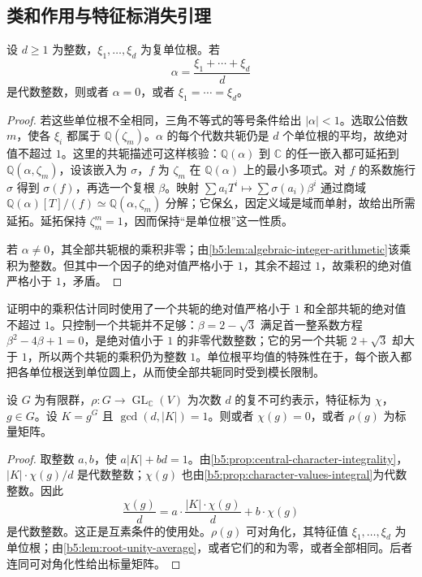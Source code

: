 \subsection{类和作用与特征标消失引理}
\label{b5:subsec:0505:02}

\begin{lemma}[单位根平均值]\label{b5:lem:root-unity-average}
	设 \(d\ge1\) 为整数，\(\xi_1,\ldots,\xi_d\) 为复单位根。若
	\[
		\alpha=\frac{\xi_1+\cdots+\xi_d}{d}
	\]
	是代数整数，则或者 \(\alpha=0\)，或者 \(\xi_1=\cdots=\xi_d\)。
\end{lemma}
\begin{proof}
	若这些单位根不全相同，三角不等式的等号条件给出 \(|\alpha|<1\)。选取公倍数 \(m\)，使各 \(\xi_i\) 都属于 \(\mathbb Q(\zeta_m)\)。\(\alpha\) 的每个代数共轭仍是 \(d\) 个单位根的平均，故绝对值不超过 \(1\)。这里的共轭描述可这样核验：\(\mathbb Q(\alpha)\) 到 \(\mathbb C\) 的任一嵌入都可延拓到 \(\mathbb Q(\alpha,\zeta_m)\)，设该嵌入为 \(\sigma\)，\(f\) 为 \(\zeta_m\) 在 \(\mathbb Q(\alpha)\) 上的最小多项式。对 \(f\) 的系数施行 \(\sigma\) 得到 \(\sigma(f)\)，再选一个复根 \(\beta\)。映射 \(\sum a_iT^i\mapsto\sum\sigma(a_i)\beta^i\) 通过商域 \(\mathbb Q(\alpha)[T]/(f)\simeq\mathbb Q(\alpha,\zeta_m)\) 分解；它保幺，因定义域是域而单射，故给出所需延拓。延拓保持 \(\zeta_m^m=1\)，因而保持“是单位根”这一性质。

	若 \(\alpha\ne0\)，其全部共轭根的乘积非零；由\cref{b5:lem:algebraic-integer-arithmetic}该乘积为整数。但其中一个因子的绝对值严格小于 \(1\)，其余不超过 \(1\)，故乘积的绝对值严格小于 \(1\)，矛盾。
\end{proof}

证明中的乘积估计同时使用了一个共轭的绝对值严格小于 \(1\) 和全部共轭的绝对值不超过 \(1\)。只控制一个共轭并不足够：\(\beta=2-\sqrt3\) 满足首一整系数方程 \(\beta^2-4\beta+1=0\)，是绝对值小于 \(1\) 的非零代数整数；它的另一个共轭 \(2+\sqrt3\) 却大于 \(1\)，所以两个共轭的乘积仍为整数 \(1\)。单位根平均值的特殊性在于，每个嵌入都把各单位根送到单位圆上，从而使全部共轭同时受到模长限制。

\begin{lemma}[消失或标量作用]\label{b5:lem:coprime-class-scalar}
	设 \(G\) 为有限群，\(\rho:G\rightarrow\operatorname{GL}_{\mathbb C}(V)\) 为次数 \(d\) 的复不可约表示，特征标为 \(\chi\)，\(g\in G\)。设 \(K=g^G\) 且 \(\gcd(d,|K|)=1\)。则或者 \(\chi(g)=0\)，或者 \(\rho(g)\) 为标量矩阵。
\end{lemma}
\begin{proof}
	取整数 \(a,b\)，使 \(a|K|+bd=1\)。由\cref{b5:prop:central-character-integrality}，\(|K|\cdot\chi(g)/d\) 是代数整数；\(\chi(g)\) 也由\cref{b5:prop:character-values-integral}为代数整数。因此
	\[
		\frac{\chi(g)}d =a\cdot\frac{|K|\cdot\chi(g)}d+b\cdot\chi(g)
	\]
	是代数整数。这正是互素条件的使用处。\(\rho(g)\) 可对角化，其特征值 \(\xi_1,\ldots,\xi_d\) 为单位根；由\cref{b5:lem:root-unity-average}，或者它们的和为零，或者全部相同。后者连同可对角化性给出标量矩阵。
\end{proof}

